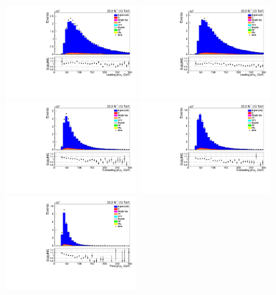 \begin{figure}[!ht]
\centering
\includegraphics[width=0.45\textwidth]{figs/background-estimation/plots/unblinded/DY_control_old_prompt_ee_ttbarInc/leadingJetPt_SingleTop_wMass_ee.pdf}
\includegraphics[width=0.45\textwidth]{figs/background-estimation/plots/unblinded/DY_control_old_prompt_mumu_ttbarInc/leadingJetPt_SingleTop_wMass_mumu.pdf}
\\
\includegraphics[width=0.45\textwidth]{figs/background-estimation/plots/unblinded/DY_control_old_prompt_ee_ttbarInc/secondJetPt_SingleTop_wMass_ee.pdf}
\includegraphics[width=0.45\textwidth]{figs/background-estimation/plots/unblinded/DY_control_old_prompt_mumu_ttbarInc/secondJetPt_SingleTop_wMass_mumu.pdf}
\\
\includegraphics[width=0.45\textwidth]{figs/background-estimation/plots/unblinded/DY_control_old_prompt_ee_ttbarInc/thirdJetPt_SingleTop_wMass_ee.pdf}

\end{figure}

